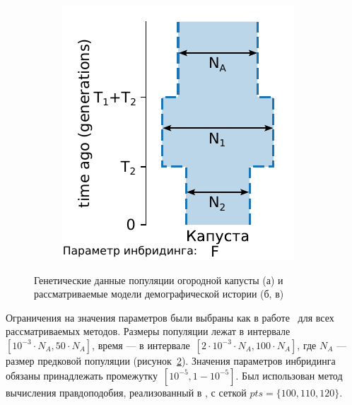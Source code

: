 \begin{figure}[ht]
\begin{subfigure}[b]{.28\textwidth}
    \caption{}
    \label{fig:part2:experiments:cabbage:model_1}
    \end{subfigure}%
    \begin{subfigure}[b]{.28\textwidth}
    \includegraphics[width=\textwidth]{images_experiments/cabbage/picture_cabbage_model_2.pdf}
    \caption{}
    \label{fig:part2:experiments:cabbage:model_2}
    \end{subfigure}
    \caption{Генетические данные популяции огородной капусты (а) и рассматриваемые модели демографической истории (б, в)}
    \label{fig:part2:experiments:cabbage:data_and_models}
\end{figure}

Ограничения на значения параметров были выбраны как в работе~\cite{blischak2020inferring} для всех рассматриваемых методов.
Размеры популяции лежат в интервале~${[10^{-3} \cdot N_A, 50 \cdot N_A]}$, время --- в интервале~${[2 \cdot 10^{-3} \cdot N_A, 100 \cdot N_A]}$, где $N_A$ --- размер предковой популяции (рисунок~\ref{fig:part2:experiments:cabbage:model_2}).
Значения параметров инбридинга обязаны принадлежать промежутку~${[10^{-5}, 1 - 10^{-5}]}$.
Был использован метод вычисления правдоподобия, реализованный в \dadi, с сеткой $pts=\{100, 110, 120\}$.


